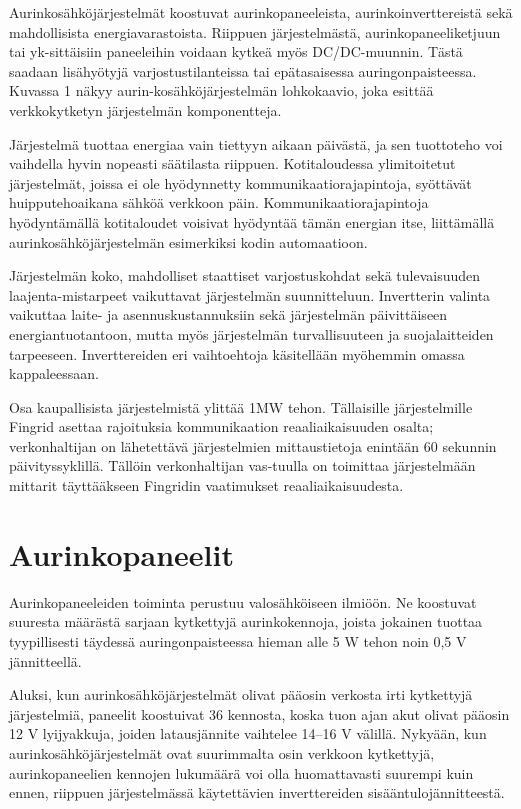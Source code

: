 Aurinkosähköjärjestelmät koostuvat aurinkopaneeleista, aurinkoinverttereistä sekä mahdollisista energiavarastoista. Riippuen järjestelmästä, aurinkopaneeliketjuun tai yk-sittäisiin paneeleihin voidaan kytkeä myös DC/DC-muunnin. Tästä saadaan lisähyötyjä varjostustilanteissa tai epätasaisessa auringonpaisteessa.  Kuvassa 1 näkyy aurin-kosähköjärjestelmän lohkokaavio, joka esittää verkkokytketyn järjestelmän komponentteja.

Järjestelmä tuottaa energiaa vain tiettyyn aikaan päivästä, ja sen tuottoteho voi vaihdella hyvin nopeasti säätilasta riippuen. Kotitaloudessa ylimitoitetut järjestelmät, joissa ei ole hyödynnetty kommunikaatiorajapintoja, syöttävät huipputehoaikana sähköä verkkoon päin. Kommunikaatiorajapintoja hyödyntämällä kotitaloudet voisivat hyödyntää tämän energian itse, liittämällä aurinkosähköjärjestelmän esimerkiksi kodin automaatioon.

Järjestelmän koko, mahdolliset staattiset varjostuskohdat sekä tulevaisuuden laajenta-mistarpeet vaikuttavat järjestelmän suunnitteluun. Invertterin valinta vaikuttaa laite- ja asennuskustannuksiin sekä järjestelmän päivittäiseen energiantuotantoon, mutta myös järjestelmän turvallisuuteen ja suojalaitteiden tarpeeseen. Inverttereiden eri vaihtoehtoja käsitellään myöhemmin omassa kappaleessaan.

Osa kaupallisista järjestelmistä ylittää 1MW tehon. Tällaisille järjestelmille Fingrid asettaa rajoituksia kommunikaation reaaliaikaisuuden osalta; verkonhaltijan on lähetettävä järjestelmien mittaustietoja enintään 60 sekunnin päivityssyklillä. Tällöin verkonhaltijan vas-tuulla on toimittaa järjestelmään mittarit täyttääkseen Fingridin vaatimukset reaaliaikaisuudesta. \parencite{VJV2018} 

\section{Aurinkopaneelit}
  Aurinkopaneeleiden toiminta perustuu valosähköiseen ilmiöön. Ne koostuvat suuresta määrästä sarjaan kytkettyjä aurinkokennoja, joista jokainen tuottaa tyypillisesti täydessä auringonpaisteessa hieman alle 5 W tehon noin 0,5 V jännitteellä. \parencite{Messenger}

  Aluksi, kun aurinkosähköjärjestelmät olivat pääosin verkosta irti kytkettyjä järjestelmiä, paneelit koostuivat 36 kennosta, koska tuon ajan akut olivat pääosin 12 V lyijyakkuja, joiden latausjännite vaihtelee 14–16 V välillä. Nykyään, kun aurinkosähköjärjestelmät ovat suurimmalta osin verkkoon kytkettyjä, aurinkopaneelien kennojen lukumäärä voi olla huomattavasti suurempi kuin ennen, riippuen järjestelmässä käytettävien inverttereiden sisääntulojännitteestä. \parencite{Messenger}

